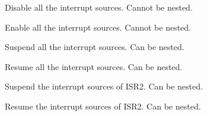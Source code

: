 \documentclass[10pt,notumble]{leaflet}   	%
\begin{document}


Disable all the interrupt sources. Cannot be nested.


Enable all the interrupt sources. Cannot be nested.


Suspend all the interrupt sources. Can be nested.


Resume all the interrupt sources. Can be nested.


Suspend the interrupt sources of ISR2. Can be nested.


Resume the interrupt sources of ISR2. Can be nested.
\end{document}
